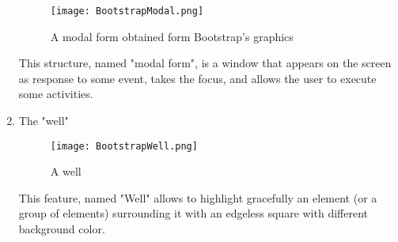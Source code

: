 \begin{enumerate}
\begin{figure}[H]
\centering
\texttt{[image: BootstrapModal.png]} 
\caption{A modal form obtained form Bootstrap's graphics}
\end{figure}

This structure, named "modal form", is a window that appears on the screen as response to some event, takes the focus, and allows the user to execute some activities. 

\item The "well"

\begin{figure}[H]
\centering
\texttt{[image: BootstrapWell.png]} 
\caption{A well}
\end{figure}

This feature, named "Well" allows to highlight gracefully an element (or a group of elements) surrounding it with an edgeless square with different background color. 

\end{enumerate}
